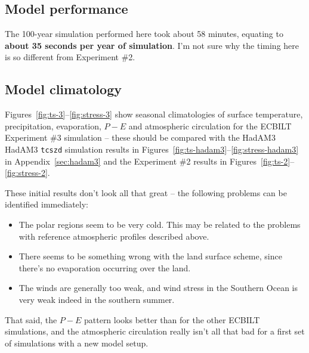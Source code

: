\documentclass[a4paper,11pt]{article}
\begin{document}
\subsection{Model performance}

The 100-year simulation performed here took about 58 minutes, equating
to \textbf{about 35 seconds per year of simulation}.  I'm not sure why
the timing here is so different from Experiment \#2.

\subsection{Model climatology}

Figures~\ref{fig:ts-3}--\ref{fig:stress-3} show seasonal climatologies
of surface temperature, precipitation, evaporation, $P-E$ and
atmospheric circulation for the ECBILT Experiment \#3 simulation --
these should be compared with the HadAM3 HadAM3 \texttt{tcszd}
simulation results in
Figures~\ref{fig:ts-hadam3}--\ref{fig:stress-hadam3} in
Appendix~\ref{sec:hadam3} and the Experiment \#2 results in
Figures~\ref{fig:ts-2}--\ref{fig:stress-2}.

These initial results don't look all that great -- the following
problems can be identified immediately:
\begin{itemize}
  \item{The polar regions seem to be very cold.  This may be related
    to the problems with reference atmospheric profiles described
    above.}
  \item{There seems to be something wrong with the land surface
    scheme, since there's no evaporation occurring over the land.}
  \item{The winds are generally too weak, and wind stress in the
    Southern Ocean is very weak indeed in the southern summer.}
\end{itemize}

That said, the $P-E$ pattern looks better than for the other ECBILT
simulations, and the atmospheric circulation really isn't all that bad
for a first set of simulations with a new model setup.
\end{document}
